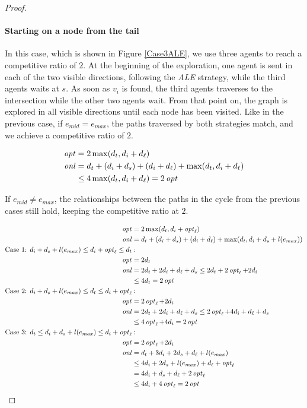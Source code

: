 \begin{proof}
\paragraph*{Starting on a node from the tail}
In this case, which is shown in Figure \ref{Case3ALE}, we use three agents to reach a competitive ratio of $2$. At the beginning of the exploration,
one agent is sent in each of the two visible directions, following the \textit{ALE} strategy, while the third agents waits at $s$. As soon as $v_i$ is found, the
third agents traverses to the intersection while the other two agents wait. From that point on, the graph is explored in all visible directions until each node has been visited.
Like in the previous case, if $e_{mid} = e_{max}$, the paths traversed by both strategies match, and we achieve a competitive ratio of $2$.

\begin{align*}
    \small
    \mathop{\mathit{opt}}\nolimits &= 2\max(d_t, d_i + d_\ell)\\
    \mathop{\mathit{onl}}\nolimits &= d_t + (d_i + d_s) + (d_i + d_\ell) + \max(d_t, d_i + d_\ell)\\
    &\leq 4\max(d_t, d_i + d_\ell) = 2\mathop{\mathit{opt}}\nolimits\\
\end{align*}

If $e_{mid} \neq e_{max}$, the relationships between the paths in the cycle from the previous cases still hold, keeping the competitive ratio at $2$.

\begin{align*}
    \small
    \mathop{\mathit{opt}}\nolimits &= 2\max(d_t, d_i + \mathop{\mathit{opt}}\nolimits_\ell)\\
    \mathop{\mathit{onl}}\nolimits &= d_t + (d_i + d_s) + (d_i + d_\ell) + \max(d_t, d_i + d_s + l(e_{max}))\\
    \text{Case 1: } d_i + d_s + l(e_{max}) \leq d_i + \mathop{\mathit{opt}}\nolimits_\ell \leq d_t&:\\
    \mathop{\mathit{opt}}\nolimits &= 2d_t\\
    \mathop{\mathit{onl}}\nolimits &= 2d_t + 2d_i + d_\ell + d_s \leq 2d_t + 2\mathop{\mathit{opt}}\nolimits_\ell + 2d_i\\
    &\leq 4d_t = 2\mathop{\mathit{opt}}\nolimits\\
    \text{Case 2: } d_i + d_s + l(e_{max}) \leq d_t \leq d_i + \mathop{\mathit{opt}}\nolimits_\ell&:\\
    \mathop{\mathit{opt}}\nolimits &= 2\mathop{\mathit{opt}}\nolimits_\ell + 2d_i\\
    \mathop{\mathit{onl}}\nolimits &= 2d_t + 2d_i + d_\ell + d_s \leq 2\mathop{\mathit{opt}}\nolimits_\ell + 4d_i + d_\ell + d_s\\
    &\leq 4\mathop{\mathit{opt}}\nolimits_\ell + 4d_i = 2\mathop{\mathit{opt}}\nolimits\\
    \text{Case 3: } d_t \leq d_i + d_s + l(e_{max}) \leq d_i + \mathop{\mathit{opt}}\nolimits_\ell&:\\
    \mathop{\mathit{opt}}\nolimits &= 2\mathop{\mathit{opt}}\nolimits_\ell + 2d_i\\
    \mathop{\mathit{onl}}\nolimits &= d_t + 3d_i + 2d_s + d_\ell + l(e_{max})\\
    &\leq 4d_i + 2d_s + l(e_{max}) + d_\ell + \mathop{\mathit{opt}}\nolimits_\ell\\
    &= 4d_i + d_s + d_\ell + 2\mathop{\mathit{opt}}\nolimits_\ell\\
    &\leq 4d_i + 4\mathop{\mathit{opt}}\nolimits_\ell = 2\mathop{\mathit{opt}}\nolimits
\end{align*}


\end{proof}
